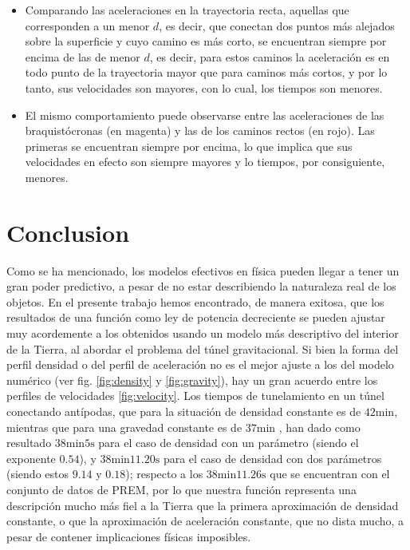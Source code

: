 \documentclass[aps,twocolumn,showpacs,preprintnumbers]{revtex4}
\begin{document}
        \begin{itemize}
            \item Comparando las aceleraciones en la trayectoria recta, aquellas que corresponden a un menor $d$, es decir, que conectan dos puntos más alejados sobre la superficie y cuyo camino es más corto, se encuentran siempre por encima de las de menor $d$, es decir, para estos caminos la aceleración  es en todo punto de la trayectoria mayor que para caminos más cortos, y por lo tanto, sus velocidades son mayores, con lo cual, los tiempos son menores.
            
            \item El mismo comportamiento puede observarse entre las aceleraciones de las braquistócronas (en magenta) y las de los caminos rectos (en rojo). Las primeras se encuentran siempre por encima, lo que implica que sus velocidades en efecto son siempre mayores y lo tiempos, por consiguiente, menores.
            
        \end{itemize}
        
    \newline

\section{Conclusion}

    Como se ha mencionado, los modelos efectivos en física pueden llegar a tener un gran poder predictivo, a pesar de no estar describiendo la naturaleza real de los objetos. En el presente trabajo hemos encontrado, de manera exitosa, que los resultados de una función como ley de potencia decreciente se pueden ajustar muy acordemente a los obtenidos usando un modelo más descriptivo del interior de la Tierra, al abordar el problema del túnel gravitacional. Si bien la forma del perfil densidad o del perfil de aceleración no es el mejor ajuste a los del modelo numérico (ver fig. \ref{fig:density} y \ref{fig:gravity}), hay un gran acuerdo entre los perfiles de velocidades \ref{fig:velocity}. Los tiempos de tunelamiento en un túnel conectando antípodas, que para la situación de densidad constante es de $42 \text{min}$\cite{Venezian}, mientras que para una gravedad constante es de $37\text{min}$ \citep{gravity-train-prem}, han dado como resultado $38\text{min} 5 \text{s} $ para el caso de densidad con un parámetro (siendo el exponente $0.54$), y $38\text{min} 11.20 \text{s} $ para el caso de densidad con dos parámetros (siendo estos $9.14$ y $0.18$); respecto a los $38\text{min} 11.26 \text{s} $ que se encuentran con el conjunto de datos de PREM, por lo que nuestra función representa una descripción mucho más fiel a la Tierra que la primera aproximación de densidad constante, o que la aproximación de aceleración constante, que no dista mucho, a pesar de contener implicaciones físicas imposibles. 
    
\end{document}
